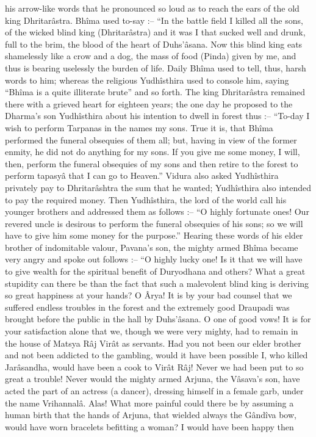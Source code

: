 his arrow-like words that he pronounced so loud as to reach the ears of the old king Dhritarâstra. Bhîma used to-say :-- “In the battle field I killed all the sons, of the wicked blind king (Dhritarâstra) and it was I that sucked well and drunk, full to the brim, the blood of the heart of Duhs'âsana. Now this blind king eats shamelessly like a crow and a dog, the mass of food (Pinda) given by me, and thus is bearing uselessly the burden of life. Daily Bhîma used to tell, thus, harsh words to him; whereas the religious Yudhîsthira used to console him, saying “Bhîma is a quite illiterate brute” and so forth. The king Dhritarâstra remained there with a grieved heart for eighteen years; the one day he proposed to the Dharma's son Yudhîsthira about his intention to dwell in forest thus :-- “To-day I wish to perform Tarpanas in the names my sons. True it is, that Bhîma performed the funeral obsequies of them all; but, having in view of the former enmity, he did not do anything for my sons. If you give me some money, I will, then, perform the funeral obsequies of my sons and then retire to the forest to perform tapasyâ that I can go to Heaven.” Vidura also asked Yudhîsthira privately pay to Dhritarâshtra the sum that he wanted; Yudhîsthira also intended to pay the required money. Then Yudhîsthira, the lord of the world call his younger brothers and addressed them as follows :-- “O highly fortunate ones! Our revered uncle is desirous to perform the funeral obsequies of his sons; so we will have to give him some money for the purpose.” Hearing these words of his elder brother of indomitable valour, Pavana's son, the mighty armed Bhîma became very angry and spoke out follows :-- “O highly lucky one! Is it that we will have to give wealth for the spiritual benefit of Duryodhana and others? What a great stupidity can there be than the fact that such a malevolent blind king is deriving so great happiness at your hands? O Ârya! It is by your bad counsel that we suffered endless troubles in the forest and the extremely good Draupadi was brought before the public in the hall by Duhs'âsana. O one of good vows! It is for your satisfaction alone that we, though we were very mighty, had to remain in the house of Matsya Râj Virât as servants. Had you not been our elder brother and not been addicted to the gambling, would it have been possible I, who killed Jarâsandha, would have been a cook to Virât Râj! Never we had been put to so great a trouble! Never would the mighty armed Arjuna, the Vâsava's son, have acted the part of an actress (a dancer), dressing himself in a female garb, under the name Vrihannalâ. Alas! What more painful could there be by assuming a human birth that the hands of Arjuna, that wielded always the Gândîva bow, would have worn bracelets befitting a woman? I would have been happy then

